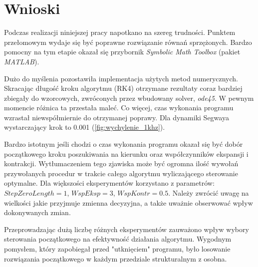 \section{Wnioski}
\label{sec:wnioski}

Podczas realizacji niniejszej pracy napotkano na szereg trudności. Punktem przełomowym wydaje się być poprawne rozwiązanie równań sprzężonych. Bardzo pomocny na tym etapie okazał się przybornik \textit{Symbolic Math Toolbox} (pakiet \textit{MATLAB}).

Dużo do myślenia pozostawiła implementacja użytych metod numerycznych. Skracając długość kroku algorytmu (RK4) otrzymane rezultaty coraz bardziej zbiegały do wzorcowych, zwróconych przez wbudowany solver, \textit{ode45}. W pewnym momencie różnica ta przestała maleć. Co więcej, czas wykonania programu wzrastał niewspółmiernie do otrzymanej poprawy. Dla dynamiki Segwaya wystarczający krok to 0.001 (\ref{fig:wychylenie_1khz}).

Bardzo istotnym jeśli chodzi o czas wykonania programu okazał się być dobór początkowego kroku poszukiwania na kierunku oraz współczynników  ekspansji i kontrakcji. Wytłumaczeniem tego zjawiska może być ogromna ilość wywołań przywołanych procedur w trakcie całego algorytmu wyliczającego sterowanie optymalne. Dla większości eksperymentów korzystano z parametrów: $StepZeroLength = 1$, $WspEksp = 3$, $WspKontr = 0.5$. Należy zwrócić uwagę na wielkości jakie przyjmuje zmienna decyzyjna, a także uważnie obserwować wpływ dokonywanych zmian.

Przeprowadzając dużą liczbę różnych eksperymentów zauważono wpływ wybory sterowania początkowego na efektywność działania algorytmu. Wygodnym pomysłem, który zapobiegał przed "utknięciem" programu, było losowanie rozwiązania początkowego w każdym przedziale strukturalnym z osobna.



